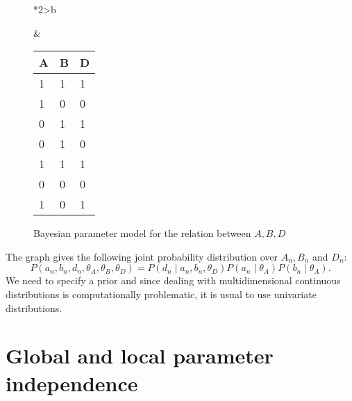 \begin{figure}[!ht]
  \begin{tabular}{*{2}{>{\centering\arraybackslash}b{}}}
  \centering
  \begin{tikzpicture}[
    node distance=1cm and 0.5cm,
    mynode/.style={draw,circle,text width=0.5cm,align=center}
    ]

    \node[mynode] (d) {\(D_{n}\)};
    \node[mynode, above left=of d] (a) {\(A_{n}\)};
    \node[mynode, above right=of d] (b) {\(B_{n}\)};
    \node[mynode, above=of a] (ta) {\(\theta_{A}\)};
    \node[mynode, above=of b] (tb) {\(\theta_{B}\)};
    \node[mynode, below=of d] (td) {\(\theta_{D}\)};
    \plate{} {(d)(a)(b)} {\(n= 1\dots N\)}; %
    \path (a) edge[-latex] (d)
    (b) edge[-latex] (d)
    (ta) edge[-latex] (a)
    (tb) edge[-latex] (b)
    (td) edge[-latex] (d)
    ;

  \end{tikzpicture}
    \caption{Bayesian parameter model for the relation between \(A,B,D\)}\label{fig:bayesian_example}
    &
      \renewcommand{\arraystretch}{1.3}
      \begin{tabular}{|l|l|l|}
    \hline
    A & B & D \\ \hline
    1 & 1 & 1 \\ \hline
    1 & 0 & 0 \\ \hline
    0 & 1 & 1 \\ \hline
    0 & 1 & 0 \\ \hline
    1 & 1 & 1 \\ \hline
    0 & 0 & 0 \\ \hline
    1 & 0 & 1 \\ \hline
  \end{tabular}
\end{tabular}
\end{figure}

The graph gives the following joint probability distribution over \(A_{n}, B_{n}\) and \(D_{n}\):
\[
P(a_{n},b_{n},d_{n}, \theta_A, \theta_B, \theta_D) = P(d_{n}\mid a_{n},b_{n},\theta_D)P(a_{n} \mid \theta_A)P(b_{n} \mid \theta_A).
\]
We need to specify a prior and since dealing with multidimensional continuous
distributions is computationally problematic, it is usual to use univariate
distributions.

\section{Global and local parameter independence}

